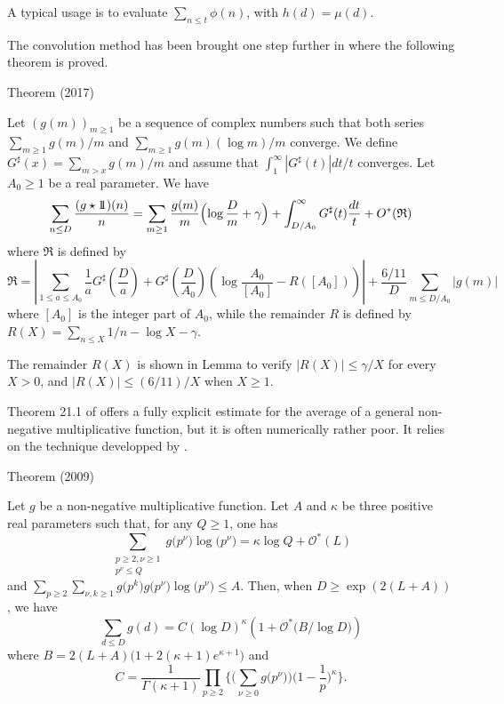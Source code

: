 A typical usage is to evaluate $\sum_{n\le t}\phi(n)$, with
$h(d)=\mu(d)$.

  
The convolution method has been brought one step further in
\cite{Ramare*14-1}
where the following theorem is proved.

\begin{thm}{Theorem (2017)}

Let $(g(m))_{m\ge1}$ be a sequence of complex numbers such that both series
  $\sum_{m\ge1} g(m)/m$ and $\sum_{m\ge1} g(m)(\log m)/m$ converge. We define
  $G^\sharp(x)=\sum_{m> x} g(m)/m$ and assume that
  $\int_1^\infty |G^\sharp(t)|dt/t$ converges. Let $A_0\ge1$ be a real parameter.
  We have 
  \begin{equation*}
    \sum_{n\le D}\frac{(g\star{1\!\!1})(n)}{n}
    =\sum_{m\ge1}\frac{g(m)}{m}\Bigl(\log\frac{D}{m}+\gamma\Bigr)
    +\int_{D/A_0}^\infty G^\sharp(t)\frac{dt}{t}
    +O^*(\mathfrak{R})
  \end{equation*}
  where $\mathfrak{R}$ is defined by
  \begin{equation*}
    \mathfrak{R}
    =
    \left|\sum_{1\le a\le A_0}\frac{1}{a}G^\sharp\left(\frac{D}{a}\right)+
      G^\sharp\left(\frac{D}{A_0}\right)\left(\log\frac{A_0}{[A_0]}
        -R([A_0])\right)
    \right|
    +\frac{6/11}{D}\sum_{m\le D/A_0}|g(m)|
  \end{equation*}
  where $[A_0]$ is the integer part of $A_0$,
while the remainder $R$ is defined by
$R(X)=\sum_{n\le X}1/n-\log X-\gamma$.
\end{thm}

The remainder $R(X)$ is shown in Lemma to verify $|R(X)|\le \gamma/X$
for every $X > 0$, and $|R(X)|\le (6/11)/X$ when $X\ge1$.



Theorem 21.1 of
\cite{Ramare*06}
offers a fully explicit estimate for the average of a general non-negative
multiplicative function, but 
it is often numerically rather poor. It relies on the
technique developped by 
\cite{Levin-Fainleib*67}.


\begin{thm}{Theorem (2009)}

Let $g$ be a non-negative multiplicative function.
Let $A$ and $\kappa$ be three positive real parameters such that, for any
$Q\ge1$, one has
$$
\sum_{\substack{ p\ge2, \nu\ge1\\  p^{\nu}\le Q}}
g\bigl(p^{\nu}\bigr)\log\bigl(p^{\nu}\bigr)
=
\kappa\log Q+\mathcal{O}^*(L)
$$
and
$
\sum_{p\ge2}
\sum_{\nu,k\ge1}g\bigl(p^k\bigr)g\bigl(p^{\nu}\bigr)\log\bigl(p^{\nu}\bigr)
\le A.
$
Then, when $D\ge\exp(2(L+A))$, we have
$$
\sum_{d\le D}g(d)= C\left(\log D\right)^{\kappa}
\left(1+\mathcal{O}^*\bigl(B/\log D\bigr)\right)
$$
where $B=2(L+A)\bigl(1+2(\kappa+1)e^{\kappa+1}\bigr)$ and
$$
C=\frac{1}{\Gamma(\kappa+1)}
\prod_{p\ge2}\biggl\{
\biggl(\sum_{\nu\ge0}g\bigl(p^{\nu}\bigr)\biggr)
\biggl(1-\frac1p\biggr)^{\kappa}\biggr\}.
$$
\end{thm}



